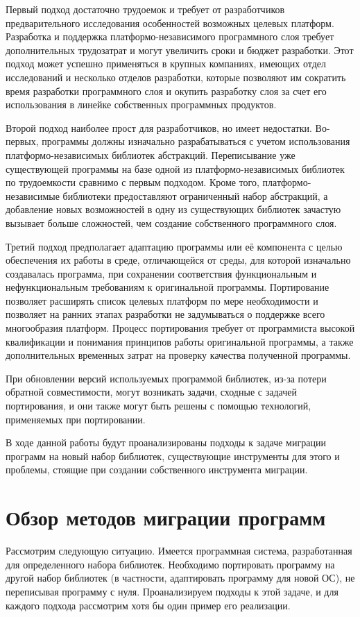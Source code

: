 Первый подход достаточно трудоемок и требует от разработчиков предварительного исследования особенностей возможных целевых платформ. Разработка и поддержка платформо-независимого программного слоя требует дополнительных трудозатрат и могут увеличить сроки и бюджет разработки. Этот подход может успешно применяться в крупных компаниях, имеющих отдел исследований и несколько отделов разработки, которые позволяют им сократить время разработки программного слоя и окупить разработку слоя за счет его использования в линейке собственных программных продуктов.

Второй подход наиболее прост для разработчиков, но имеет недостатки. Во-первых, программы должны изначально разрабатываться с учетом использования платформо-независимых библиотек абстракций. Переписывание уже существующей программы на базе одной из платформо-независимых библиотек по трудоемкости сравнимо с первым подходом. Кроме того, платформо-независимые библиотеки предоставляют ограниченный набор абстракций, а добавление новых возможностей в одну из существующих библиотек зачастую вызывает больше сложностей, чем создание собственного программного слоя.

Третий подход предполагает адаптацию программы или её компонента с целью обеспечения их работы в среде, отличающейся от среды, для которой изначально создавалась программа, при сохранении соответствия функциональным и нефункциональным требованиям к оригинальной программы. Портирование позволяет расширять список целевых платформ по мере необходимости и позволяет на ранних этапах разработки не задумываться о поддержке всего многообразия платформ. Процесс портирования требует от программиста высокой квалификации и понимания принципов работы оригинальной программы, а также дополнительных временных затрат на проверку качества полученной программы.

При обновлении версий используемых программой библиотек, из-за потери обратной совместимости, могут возникать задачи, сходные с задачей портирования, и они также могут быть решены с помощью технологий, применяемых при портировании.

В ходе данной работы будут проанализированы подходы к задаче миграции программ на новый набор библиотек, существующие инструменты для этого и проблемы, стоящие при создании собственного инструмента миграции.

\section{Обзор методов миграции программ}
Рассмотрим следующую ситуацию. Имеется программная система, разработанная для определенного набора библиотек. Необходимо портировать программу на другой набор библиотек (в частности, адаптировать программу для новой ОС), не переписывая программу с нуля. Проанализируем подходы к этой задаче, и для каждого подхода рассмотрим хотя бы один пример его реализации.

